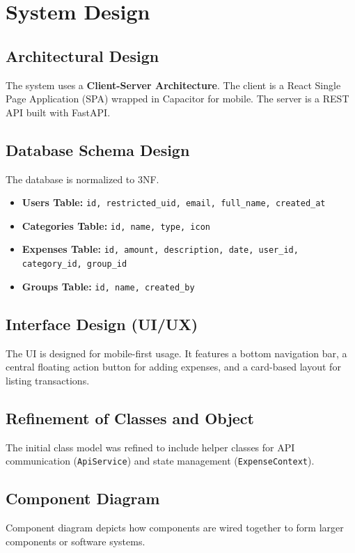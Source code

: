 \section{System Design}

\subsection{Architectural Design}
The system uses a \textbf{Client-Server Architecture}. The client is a React Single Page Application (SPA) wrapped in Capacitor for mobile. The server is a REST API built with FastAPI.

\subsection{Database Schema Design}
The database is normalized to 3NF.
\begin{itemize}
    \item \textbf{Users Table:} \texttt{id, restricted\_uid, email, full\_name, created\_at}
    \item \textbf{Categories Table:} \texttt{id, name, type, icon}
    \item \textbf{Expenses Table:} \texttt{id, amount, description, date, user\_id, category\_id, group\_id}
    \item \textbf{Groups Table:} \texttt{id, name, created\_by}
\end{itemize}

\subsection{Interface Design (UI/UX)}
The UI is designed for mobile-first usage. It features a bottom navigation bar, a central floating action button for adding expenses, and a card-based layout for listing transactions.

\subsection{Refinement of Classes and Object}
The initial class model was refined to include helper classes for API communication (\texttt{ApiService}) and state management (\texttt{ExpenseContext}).

\subsection{Component Diagram}
Component diagram depicts how components are wired together to form larger components or software systems.

